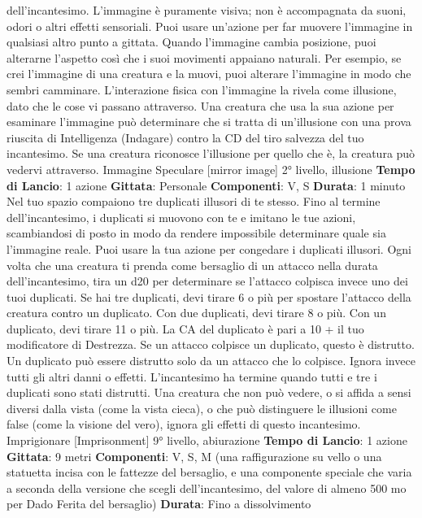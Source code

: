 \begin{multicols}{2}
dell’incantesimo. L’immagine è puramente visiva; non è
accompagnata da suoni, odori o altri effetti sensoriali.
Puoi usare un’azione per far muovere l’immagine in
qualsiasi altro punto a gittata. Quando l’immagine
cambia posizione, puoi alterarne l’aspetto così che i
suoi movimenti appaiano naturali. Per esempio, se crei
l’immagine di una creatura e la muovi, puoi alterare
l’immagine in modo che sembri camminare.
L’interazione fisica con l’immagine la rivela come
illusione, dato che le cose vi passano attraverso. Una
creatura che usa la sua azione per esaminare
l’immagine può determinare che si tratta di un’illusione
con una prova riuscita di Intelligenza (Indagare) contro
la CD del tiro salvezza del tuo incantesimo. Se una
creatura riconosce l’illusione per quello che è, la
creatura può vedervi attraverso.
Immagine Speculare
[mirror image]
2° livello, illusione
\textbf{Tempo di Lancio}: 1 azione
\textbf{Gittata}: Personale
\textbf{Componenti}: V, S
\textbf{Durata}: 1 minuto
Nel tuo spazio compaiono tre duplicati illusori di te
stesso. Fino al termine dell’incantesimo, i duplicati si
muovono con te e imitano le tue azioni, scambiandosi di
posto in modo da rendere impossibile determinare
quale sia l’immagine reale. Puoi usare la tua azione per
congedare i duplicati illusori.
Ogni volta che una creatura ti prenda come bersaglio di
un attacco nella durata dell’incantesimo, tira un d20 per
determinare se l’attacco colpisca invece uno dei tuoi
duplicati.
Se hai tre duplicati, devi tirare 6 o più per spostare
l’attacco della creatura contro un duplicato. Con due
duplicati, devi tirare 8 o più. Con un duplicato, devi
tirare 11 o più.
La CA del duplicato è pari a 10 + il tuo modificatore di
Destrezza. Se un attacco colpisce un duplicato, questo
è distrutto. Un duplicato può essere distrutto solo da un
attacco che lo colpisce. Ignora invece tutti gli altri danni
o effetti. L’incantesimo ha termine quando tutti e tre i
duplicati sono stati distrutti.
Una creatura che non può vedere, o si affida a sensi
diversi dalla vista (come la vista cieca), o che può 
distinguere le illusioni come false (come la visione del
vero), ignora gli effetti di questo incantesimo.
Imprigionare
[Imprisonment]
9° livello, abiurazione
\textbf{Tempo di Lancio}: 1 azione
\textbf{Gittata}: 9 metri
\textbf{Componenti}: V, S, M (una raffigurazione su vello o una
statuetta incisa con le fattezze del bersaglio, e una
componente speciale che varia a seconda della
versione che scegli dell’incantesimo, del valore di
almeno 500 mo per Dado Ferita del bersaglio)
\textbf{Durata}: Fino a dissolvimento

\end{multicols}
